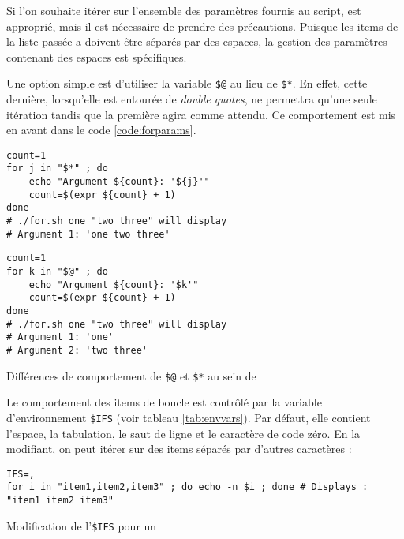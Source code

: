 Si l'on souhaite itérer sur l'ensemble des paramètres fournis au script,  est approprié, mais il est nécessaire de prendre des précautions. Puisque les items de la liste passée a  doivent être séparés par des espaces, la gestion des paramètres contenant des espaces est spécifiques.

Une option simple est d'utiliser la variable \texttt{\$@} au lieu de \texttt{\$*}. En effet, cette dernière, lorsqu'elle est entourée de \textit{double quotes}, ne permettra qu'une seule itération tandis que la première agira comme attendu. Ce comportement est mis en avant dans le code \ref{code:forparams}.

\vspace{\baselineskip}
\begin{code}
    \centering
    \noindent\begin{minipage}{.475\textwidth}
    \begin{verbatim}
count=1
for j in "$*" ; do
    echo "Argument ${count}: '${j}'"
    count=$(expr ${count} + 1)
done
# ./for.sh one "two three" will display
# Argument 1: 'one two three'
\end{verbatim}
\end{minipage}\hfill
\begin{minipage}{.475\textwidth}
\begin{verbatim}
count=1
for k in "$@" ; do
    echo "Argument ${count}: '$k'"
    count=$(expr ${count} + 1)
done
# ./for.sh one "two three" will display 
# Argument 1: 'one'
# Argument 2: 'two three'
\end{verbatim}
\end{minipage}\hfill
\caption{Différences de comportement de \texttt{\$@} et \texttt{\$*} au sein de }
    \label{code:forparams}
\end{code}

Le comportement des items de boucle est contrôlé par la variable d'environnement \texttt{\$IFS} (voir tableau \ref{tab:envvars}). Par défaut, elle contient l'espace, la tabulation, le saut de ligne et le caractère de code zéro. En la modifiant, on peut itérer sur des items séparés par d'autres caractères :
\begin{code}
\begin{verbatim}
IFS=,
for i in "item1,item2,item3" ; do echo -n $i ; done # Displays : "item1 item2 item3"
\end{verbatim}
\vspace{-2mm}
\caption{Modification de l'\texttt{\$IFS} pour un }
    \label{code:forifs}
\end{code}

